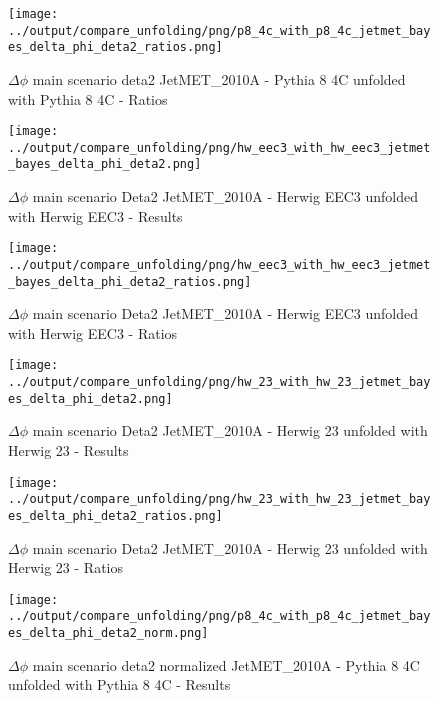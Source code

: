 \documentclass[11pt]{book}
\begin{document}
\begin{figure}[ht]
\centering
\texttt{[image: ../output/compare\_unfolding/png/p8\_4c\_with\_p8\_4c\_jetmet\_bayes\_delta\_phi\_deta2\_ratios.png]}
\caption{$\Delta\phi$ main scenario deta2 JetMET\_2010A - Pythia 8 4C unfolded with Pythia 8 4C - Ratios}
\label{p8_p8_jetmet_bayes_delta_phi_deta2_b}
\end{figure}

\begin{figure}[ht]
\centering
\texttt{[image: ../output/compare\_unfolding/png/hw\_eec3\_with\_hw\_eec3\_jetmet\_bayes\_delta\_phi\_deta2.png]}
\caption{$\Delta\phi$ main scenario Deta2 JetMET\_2010A - Herwig EEC3 unfolded with Herwig EEC3 - Results}
\label{hw_eec3_hw_eec3_jetmet_bayes_delta_phi_deta2_a}
\end{figure}

\begin{figure}[ht]
\centering
\texttt{[image: ../output/compare\_unfolding/png/hw\_eec3\_with\_hw\_eec3\_jetmet\_bayes\_delta\_phi\_deta2\_ratios.png]}
\caption{$\Delta\phi$ main scenario Deta2 JetMET\_2010A - Herwig EEC3 unfolded with Herwig EEC3 - Ratios}
\label{hw_eec3_hw_eec3_jetmet_bayes_delta_phi_deta2_b}
\end{figure}

\begin{figure}[ht]
\centering
\texttt{[image: ../output/compare\_unfolding/png/hw\_23\_with\_hw\_23\_jetmet\_bayes\_delta\_phi\_deta2.png]}
\caption{$\Delta\phi$ main scenario Deta2 JetMET\_2010A - Herwig 23 unfolded with Herwig 23 - Results}
\label{hw_23_hw_23_jetmet_bayes_delta_phi_deta2_a}
\end{figure}

\begin{figure}[ht]
\centering
\texttt{[image: ../output/compare\_unfolding/png/hw\_23\_with\_hw\_23\_jetmet\_bayes\_delta\_phi\_deta2\_ratios.png]}
\caption{$\Delta\phi$ main scenario Deta2 JetMET\_2010A - Herwig 23 unfolded with Herwig 23 - Ratios}
\label{hw_23_hw_23_jetmet_bayes_delta_phi_deta2_b}
\end{figure}

\begin{figure}[ht]
\centering
\texttt{[image: ../output/compare\_unfolding/png/p8\_4c\_with\_p8\_4c\_jetmet\_bayes\_delta\_phi\_deta2\_norm.png]}
\caption{$\Delta\phi$ main scenario deta2 normalized JetMET\_2010A - Pythia 8 4C unfolded with Pythia 8 4C - Results}
\label{p8_p8_jetmet_bayes_delta_phi_deta2_norm_a}
\end{figure}
\end{document}
